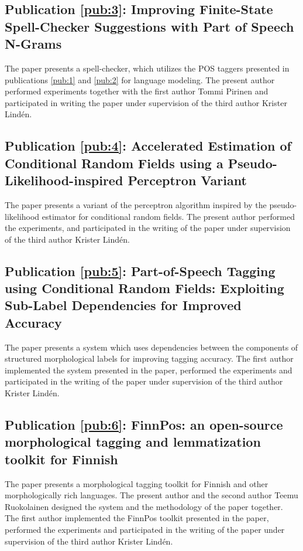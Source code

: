 \subsection*{\bf Publication \ref{pub:3}: Improving Finite-State Spell-Checker Suggestions with Part of Speech N-Grams}
\noindent The paper presents a spell-checker, which utilizes the POS
taggers presented in publications \ref{pub:1} and \ref{pub:2} for
language modeling. The present author performed experiments together
with the first author Tommi Pirinen and participated in writing the
paper under supervision of the third author Krister Lind\'{e}n.

\subsection*{\bf Publication \ref{pub:4}: Accelerated Estimation of
  Conditional Random Fields using a Pseudo-Likelihood-inspired
  Perceptron Variant} The paper presents a variant of the perceptron
algorithm inspired by the pseudo-likelihood estimator for conditional
random fields. The present author performed the experiments, and
participated in the writing of the paper under supervision of the
third author Krister Lind\'{e}n.


\subsection*{\bf Publication \ref{pub:5}: Part-of-Speech Tagging using
  Conditional Random Fields: Exploiting Sub-Label Dependencies for
  Improved Accuracy} The paper presents a system which uses
dependencies between the components of structured morphological labels
for improving tagging accuracy. The first author implemented the
system presented in the paper, performed the experiments and
participated in the writing of the paper under supervision of the
third author Krister Lind\'{e}n.


\subsection*{\bf Publication \ref{pub:6}: FinnPos: an open-source morphological tagging and lemmatization toolkit for Finnish} 
The paper presents a morphological tagging toolkit for Finnish and
other morphologically rich languages. The present author and the
second author Teemu Ruokolainen designed the system and the
methodology of the paper together. The first author implemented the
FinnPos toolkit presented in the paper, performed the experiments and
participated in the writing of the paper under supervision of the
third author Krister Lind\'{e}n.
